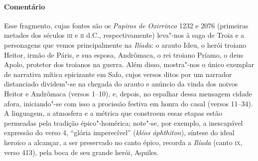 {\paragraph{Comentário} Esse fragmento, cujas fontes são os \textit{Papiros de Oxirrinco} 1232 e 2076
(primeiras metades dos séculos \textsc{iii} e \textsc{ii} d.C., respectivamente) leva"-nos à saga
de Troia e a personagens que vemos principalmente na \textit{Ilíada}: o arauto
Ideu, o herói troiano Heitor, irmão de Páris, e sua esposa, Andrômaca, o rei
troiano Príamo, o deus Apolo, protetor dos troianos na guerra. Além disso,
mostra"-nos o único exemplar de narrativa mítica epicizante
em Safo, cujos versos ditos por um narrador distanciado dividem"-se na
chegada do arauto e anúncio da vinda dos noivos Heitor e Andrômaca (versos
1--10), e, depois, no espalhar dessa mensagem cidade afora, iniciando"-se com
isso a procissão festiva em honra do casal (versos 11--34). A linguagem, a
atmosfera e a métrica que constroem essas etapas estão permeadas pela tradição
épico"-homérica; note"-se, por exemplo, a inescapável expressão do verso 4,
``glória imperecível” (\textit{kléos áphthiton}), síntese do ideal heroico a alcançar, a
ser preservado no canto épico, recorda a \textit{Ilíada }(canto \textsc{ix}, verso 413),
pela boca de seu grande herói, Aquiles.

}
